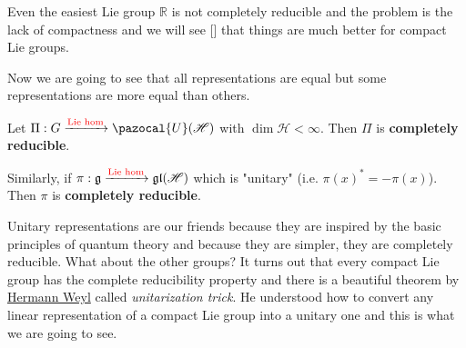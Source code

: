\documentclass[../main.tex]{subfiles}
\begin{document}
Even the easiest Lie group $\mathbb{R}$ is not completely reducible and the problem is the lack of compactness and we will see [] that things are much better for compact Lie groups.

Now we are going to see that all representations are equal but some representations are more equal than others.
\begin{proposition}
Let $\Pi:G\xrightarrow[]{{\color{red}\text{Lie hom}}}\pazocal{U}(\mathcal{H})$ with $\dim\mathcal{H}<\infty$. Then $\Pi$ is \textbf{completely reducible}. 

Similarly, if $\pi:\mathfrak{g}\xrightarrow[]{{\color{red}\text{Lie hom}}}\mathfrak{gl}(\mathcal{H})$ which is "unitary" (i.e. $\pi(x)^*=-\pi(x)$). Then $\pi$ is \textbf{completely reducible}.
\end{proposition}
Unitary representations are our friends because they are inspired by the basic principles of quantum theory and because they are simpler, they are completely reducible. What about the other groups? It turns out that every compact Lie group has the complete reducibility property and there is a beautiful theorem by \href{https://en.wikipedia.org/wiki/Hermann_Weyl}{Hermann Weyl} called \textit{unitarization trick}. He understood how to convert any linear representation of a compact Lie group into a unitary one and this is what we are going to see.
\end{document}
